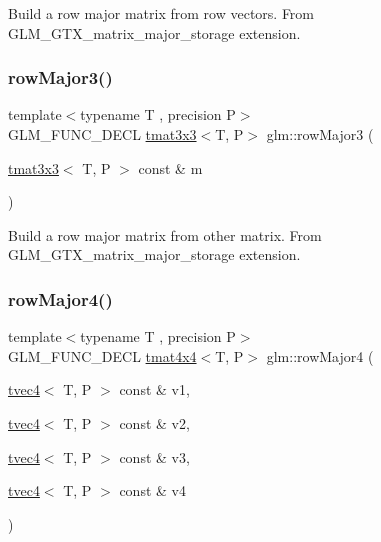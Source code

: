 Build a row major matrix from row vectors. From G\+L\+M\+\_\+\+G\+T\+X\+\_\+matrix\+\_\+major\+\_\+storage extension. \mbox{\label{group__gtx__matrix__major__storage_ga38537061135b55e7a053926ca55e6e20}} 
\subsubsection{\texorpdfstring{row\+Major3()}{rowMajor3()}\hspace{0.1cm}{\footnotesize\ttfamily [2/2]}}
{\footnotesize\ttfamily template$<$typename T , precision P$>$ \\
G\+L\+M\+\_\+\+F\+U\+N\+C\+\_\+\+D\+E\+CL \hyperlink{structglm_1_1tmat3x3}{tmat3x3}$<$T, P$>$ glm\+::row\+Major3 (\begin{DoxyParamCaption}\item[{\hyperlink{structglm_1_1tmat3x3}{tmat3x3}$<$ T, P $>$ const \&}]{m }\end{DoxyParamCaption})}

Build a row major matrix from other matrix. From G\+L\+M\+\_\+\+G\+T\+X\+\_\+matrix\+\_\+major\+\_\+storage extension. \mbox{\label{group__gtx__matrix__major__storage_ga3ce8f2a78fb2f15bf28151ee128b0ae8}} 
\subsubsection{\texorpdfstring{row\+Major4()}{rowMajor4()}\hspace{0.1cm}{\footnotesize\ttfamily [1/2]}}
{\footnotesize\ttfamily template$<$typename T , precision P$>$ \\
G\+L\+M\+\_\+\+F\+U\+N\+C\+\_\+\+D\+E\+CL \hyperlink{structglm_1_1tmat4x4}{tmat4x4}$<$T, P$>$ glm\+::row\+Major4 (\begin{DoxyParamCaption}\item[{\hyperlink{structglm_1_1tvec4}{tvec4}$<$ T, P $>$ const \&}]{v1,  }\item[{\hyperlink{structglm_1_1tvec4}{tvec4}$<$ T, P $>$ const \&}]{v2,  }\item[{\hyperlink{structglm_1_1tvec4}{tvec4}$<$ T, P $>$ const \&}]{v3,  }\item[{\hyperlink{structglm_1_1tvec4}{tvec4}$<$ T, P $>$ const \&}]{v4 }\end{DoxyParamCaption})}

